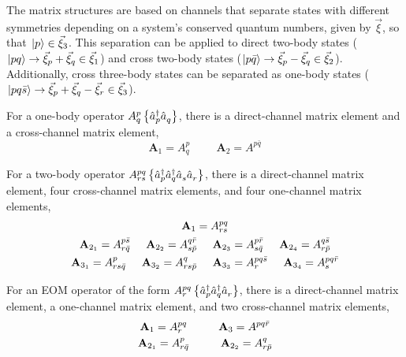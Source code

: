 \documentclass[thesis.tex]{subfiles}
\begin{document}
The matrix structures are based on channels that separate states with different symmetries depending on a system's conserved quantum numbers, given by $\vec{\xi}$, so that $\hspace{1pt}\lvert p \rangle \in \vec{\xi}_{3}$.  This separation can be applied to direct two-body states ($\hspace{1pt}\lvert pq \rangle \rightarrow \vec{\xi}_{p} + \vec{\xi}_{q} \in \vec{\xi}_{1}$) and cross two-body states ($\hspace{1pt}\lvert p\bar{q} \rangle \rightarrow \vec{\xi}_{p} - \vec{\xi}_{q} \in \vec{\xi}_{2}$).  Additionally, cross three-body states can be separated as one-body states ($\hspace{1pt}\lvert pq\bar{s} \rangle \rightarrow \vec{\xi}_{p} + \vec{\xi}_{q} - \vec{\xi}_{r} \in \vec{\xi}_{3}$).

For a one-body operator $A^{p}_{q}\left\{\hat{a}_{p}^{\dagger}\hat{a}_{q}^{}\right\}$, there is a direct-channel matrix element and a cross-channel matrix element,
\begin{equation}
  \mathbf{A}_{1} = A^{p}_{q} \hspace{1cm} \mathbf{A}_{2} = A^{p\bar{q}}
\end{equation}

For a two-body operator $A^{pq}_{rs}\left\{\hat{a}_{p}^{\dagger}\hat{a}_{q}^{\dagger}\hat{a}_{s}^{}\hat{a}_{r}^{}\right\}$, there is a direct-channel matrix element, four cross-channel matrix elements, and four one-channel matrix elements,
\begin{gather}
  \mathbf{A}_{1} = A^{pq}_{rs} \notag \\
  \mathbf{A}_{2_{1}} = A^{p\bar{s}}_{r\bar{q}} \hspace{0.5cm} \mathbf{A}_{2_{2}} = A^{q\bar{r}}_{s\bar{p}} \hspace{0.5cm} \mathbf{A}_{2_{3}} = A^{p\bar{r}}_{s\bar{q}} \hspace{0.5cm} \mathbf{A}_{2_{4}} = A^{q\bar{s}}_{r\bar{p}} \notag \\
  \mathbf{A}_{3_{1}} = A^{p}_{rs\bar{q}} \hspace{0.5cm} \mathbf{A}_{3_{2}} = A^{q}_{rs\bar{p}} \hspace{0.5cm} \mathbf{A}_{3_{3}} = A^{pq\bar{s}}_{r} \hspace{0.5cm} \mathbf{A}_{3_{4}} = A^{pq\bar{r}}_{s}
\end{gather}

For an EOM operator of the form $A^{pq}_{r}\left\{\hat{a}_{p}^{\dagger}\hat{a}_{q}^{\dagger}\hat{a}_{r}^{}\right\}$, there is a direct-channel matrix element, a one-channel matrix element, and two cross-channel matrix elements,
\begin{gather}
  \mathbf{A}_{1} = A^{pq}_{r} \hspace{1cm} \mathbf{A}_{3} = A^{pq\bar{r}} \notag \\
  \mathbf{A}_{2_{1}} = A^{p}_{r\bar{q}} \hspace{1.0cm} \mathbf{A}_{2_{2}} = A^{q}_{r\bar{p}}
\end{gather}
\end{document}

